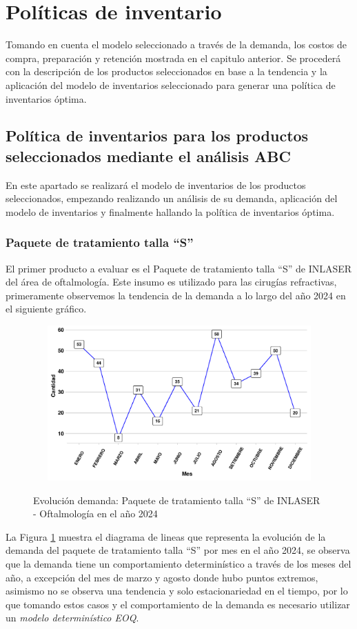 \section{Políticas de inventario}

Tomando en cuenta el modelo seleccionado a través de la demanda, los costos de compra, preparación y retención mostrada en el capitulo anterior. Se procederá con la descripción de los productos seleccionados en base a la tendencia y la aplicación del modelo de inventarios seleccionado para generar una política de inventarios óptima.

\subsection{Política de inventarios para los productos seleccionados mediante el análisis ABC}

En este apartado se realizará el modelo de inventarios de los productos seleccionados, empezando realizando un análisis de su demanda, aplicación del modelo de inventarios y finalmente hallando la política de inventarios óptima.
\subsubsection{Paquete de tratamiento talla ``S''}
El primer producto a evaluar es el Paquete de tratamiento talla ``S'' de INLASER del área de oftalmología. Este insumo es utilizado para las cirugías refractivas, primeramente observemos la tendencia de la demanda a lo largo del año 2024 en el siguiente gráfico.
\begin{figure}[H]
  \caption{Evolución demanda: Paquete de tratamiento talla ``S'' de INLASER - Oftalmología en el año 2024}
  {\includegraphics[width=15cm, height=5.95cm]{images/PROD001_demanda.pdf}}
  \label{fig:PROD001_demanda}
\end{figure}
La Figura \ref{fig:PROD001_demanda} muestra el diagrama de lineas que representa la evolución de la demanda del paquete de tratamiento talla ``S'' por mes en el año 2024, se observa que la demanda tiene un comportamiento determinístico a través de los meses del año, a excepción del mes de marzo y agosto donde hubo puntos extremos, asimismo no se observa una tendencia y solo estacionariedad en el tiempo, por lo que tomando estos casos y el comportamiento de la demanda es necesario utilizar un \textsl{modelo determinístico EOQ}.

